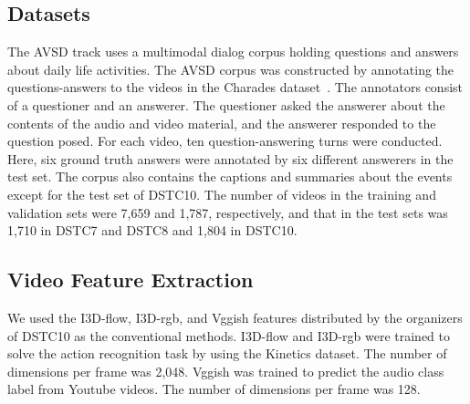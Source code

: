 \documentclass[letterpaper]{article} %
\begin{document}
\subsection{Datasets}
The AVSD track uses a multimodal dialog corpus holding questions and answers about daily life activities.
The AVSD corpus was constructed by annotating the questions-answers to the videos in the Charades dataset~\cite{Sigurdsson2016hollywood}.
The annotators consist of a questioner and an answerer.
The questioner asked the answerer about the contents of the audio and video material, and the answerer responded to the question posed.
% 
For each video, ten question-answering turns were conducted.
Here, six ground truth answers were annotated by six different answerers in the test set.
The corpus also contains the captions and summaries about the events except for the test set of DSTC10.
% 
The number of videos in the training and validation sets were 7,659 and 1,787, respectively, and that in the test sets was 1,710 in DSTC7 and DSTC8 and 1,804 in DSTC10.


\subsection{Video Feature Extraction}
We used the I3D-flow, I3D-rgb, and Vggish features distributed by the organizers of DSTC10 as the conventional methods.
I3D-flow and I3D-rgb were trained to solve the action recognition task by using the Kinetics dataset. 
The number of dimensions per frame was 2,048.
Vggish was trained to predict the audio class label from Youtube videos.
The number of dimensions per frame was 128.
\end{document}
